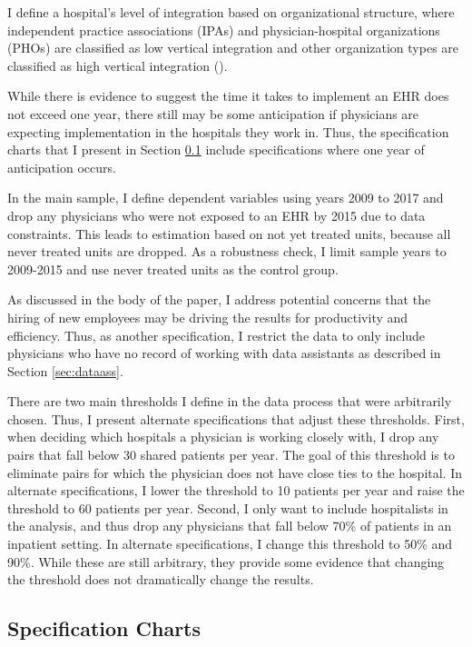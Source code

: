 \documentclass[12pt]{article}
\begin{document}
I define a hospital's level of integration based on organizational structure, where independent practice associations (IPAs) and physician-hospital organizations (PHOs) are classified as low vertical integration and other organization types are classified as high vertical integration (\cite{dynan1998assessing}). 



While there is evidence to suggest the time it takes to implement an EHR does not exceed one year, there still may be some anticipation if physicians are expecting implementation in the hospitals they work in. Thus, the specification charts that I present in Section \ref{sec:chart} include specifications where one year of anticipation occurs. 


In the main sample, I define dependent variables using years 2009 to 2017 and drop any physicians who were not exposed to an EHR by 2015 due to data constraints. This leads to estimation based on not yet treated units, because all never treated units are dropped. As a robustness check, I limit sample years to 2009-2015 and use never treated units as the control group. 

As discussed in the body of the paper, I address potential concerns that the hiring of new employees may be driving the results for productivity and efficiency. Thus, as another specification, I restrict the data to only include physicians who have no record of working with data assistants as described in Section \ref{sec:dataass}. 

There are two main thresholds I define in the data process that were arbitrarily chosen. Thus, I present alternate specifications that adjust these thresholds. First, when deciding which hospitals a physician is working closely with, I drop any pairs that fall below 30 shared patients per year. The goal of this threshold is to eliminate pairs for which the physician does not have close ties to the hospital. In alternate specifications, I lower the threshold to 10 patients per year and raise the threshold to 60 patients per year. Second, I only want to include hospitalists in the analysis, and thus drop any physicians that fall below 70\% of patients in an inpatient setting. In alternate specifications, I change this threshold to 50\% and 90\%. While these are still arbitrary, they provide some evidence that changing the threshold does not dramatically change the results. 


\subsection{Specification Charts}\label{sec:chart}
\end{document}
